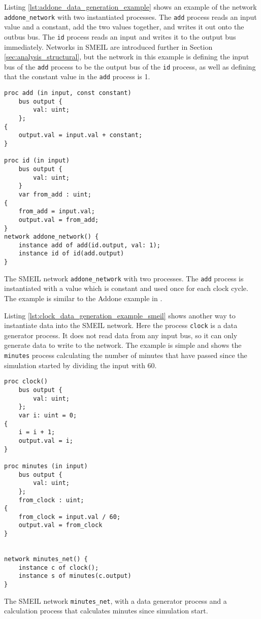 Listing \ref{lst:addone_data_generation_example} shows an example of the network \texttt{addone\_network} with two instantiated processes. The \texttt{add} process reads an input value and a constant, add the two values together, and writes it out onto the outbus bus. The \texttt{id} process reads an input and writes it to the output bus immediately. Networks in SMEIL are introduced further in Section \ref{sec:analysis_structural}, but the network in this example is defining the input bus of the \texttt{add} process to be the output bus of the \texttt{id} process, as well as defining that the constant value in the \texttt{add} process is 1.
\begin{listing}
\begin{verbatim}
proc add (in input, const constant)
    bus output {
        val: uint;
    };
{
    output.val = input.val + constant;
}

proc id (in input)
    bus output {
        val: uint;
    }
    var from_add : uint;
{
    from_add = input.val;
    output.val = from_add;
}
network addone_network() {
    instance add of add(id.output, val: 1);
    instance id of id(add.output)
}
\end{verbatim}
\caption{The SMEIL network \texttt{addone\_network} with two processes. The \texttt{add} process is instantiated with a value which is constant and used once for each clock cycle. The example is similar to the Addone example in \cite{smeil}.}
\label{lst:addone_data_generation_example}
\end{listing}
Listing \ref{lst:clock_data_generation_example_smeil} shows another way to instantiate data into the SMEIL network. Here the process \texttt{clock} is a data generator process. It does not read data from any input bus, so it can only generate data to write to the network. The example is simple and shows the \texttt{minutes} process calculating the number of minutes that have passed since the simulation started by dividing the input with 60.\\

\begin{listing}
\begin{verbatim}
proc clock()
    bus output {
        val: uint;
    };
    var i: uint = 0;
{
    i = i + 1;
    output.val = i;
}

proc minutes (in input)
    bus output {
        val: uint;
    };
    from_clock : uint;
{
    from_clock = input.val / 60;
    output.val = from_clock
}


network minutes_net() {
    instance c of clock();
    instance s of minutes(c.output)
}
\end{verbatim}
\caption{The SMEIL network \texttt{minutes\_net}, with a data generator process and a calculation process that calculates minutes since simulation start.}
\label{lst:clock_data_generation_example_smeil}
\end{listing}

